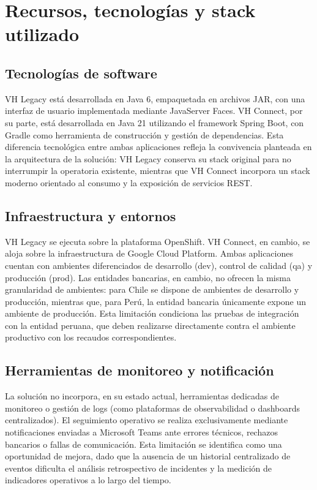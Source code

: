 \section{Recursos, tecnologías y stack utilizado}

\subsection{Tecnologías de software}

VH Legacy está desarrollada en Java 6, empaquetada en archivos JAR, con una interfaz de usuario implementada mediante JavaServer Faces. VH Connect, por su parte, está desarrollada en Java 21 utilizando el framework Spring Boot, con Gradle como herramienta de construcción y gestión de dependencias. Esta diferencia tecnológica entre ambas aplicaciones refleja la convivencia planteada en la arquitectura de la solución: VH Legacy conserva su stack original para no interrumpir la operatoria existente, mientras que VH Connect incorpora un stack moderno orientado al consumo y la exposición de servicios REST.

\subsection{Infraestructura y entornos}

VH Legacy se ejecuta sobre la plataforma OpenShift. VH Connect, en cambio, se aloja sobre la infraestructura de Google Cloud Platform. Ambas aplicaciones cuentan con ambientes diferenciados de desarrollo (dev), control de calidad (qa) y producción (prod). Las entidades bancarias, en cambio, no ofrecen la misma granularidad de ambientes: para Chile se dispone de ambientes de desarrollo y producción, mientras que, para Perú, la entidad bancaria únicamente expone un ambiente de producción. Esta limitación condiciona las pruebas de integración con la entidad peruana, que deben realizarse directamente contra el ambiente productivo con los recaudos correspondientes.

\subsection{Herramientas de monitoreo y notificación}

La solución no incorpora, en su estado actual, herramientas dedicadas de monitoreo o gestión de logs (como plataformas de observabilidad o dashboards centralizados). El seguimiento operativo se realiza exclusivamente mediante notificaciones enviadas a Microsoft Teams ante errores técnicos, rechazos bancarios o fallas de comunicación. Esta limitación se identifica como una oportunidad de mejora, dado que la ausencia de un historial centralizado de eventos dificulta el análisis retrospectivo de incidentes y la medición de indicadores operativos a lo largo del tiempo.

